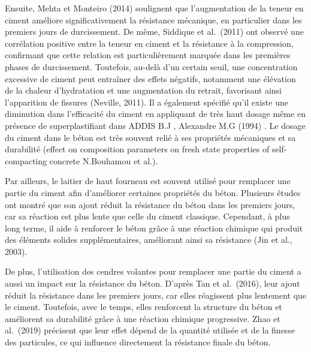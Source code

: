 \documentclass[
  12pt,
]{article}
\begin{document}
Ensuite, Mehta et Monteiro (2014) soulignent que l'augmentation de la
teneur en ciment améliore significativement la résistance mécanique, en
particulier dans les premiers jours de durcissement. De même, Siddique
et al.~(2011) ont observé une corrélation positive entre la teneur en
ciment et la résistance à la compression, confirmant que cette relation
est particulièrement marquée dans les premières phases de durcissement.
Toutefois, au-delà d'un certain seuil, une concentration excessive de
ciment peut entraîner des effets négatifs, notamment une élévation de la
chaleur d'hydratation et une augmentation du retrait, favorisant ainsi
l'apparition de fissures (Neville, 2011). Il a également spécifié qu'il
existe une diminution dans l'efficacité du ciment en appliquant de très
haut dosage même en présence de superplastifiant dans ADDIS B.J ,
Alexandre M.G (1994) . Le dosage du ciment dans le béton est très
souvent relié à ses propriétés mécaniques et sa durabilité (effect on
composition parameters on fresh state properties of self-compacting
concrete N.Bouhamou et al.).

Par ailleurs, le laitier de haut fourneau est souvent utilisé pour
remplacer une partie du ciment afin d'améliorer certaines propriétés du
béton. Plusieurs études ont montré que son ajout réduit la résistance du
béton dans les premiers jours, car sa réaction est plus lente que celle
du ciment classique. Cependant, à plus long terme, il aide à renforcer
le béton grâce à une réaction chimique qui produit des éléments solides
supplémentaires, améliorant ainsi sa résistance (Jin et al., 2003).

De plus, l'utilisation des cendres volantes pour remplacer une partie du
ciment a aussi un impact sur la résistance du béton. D'après Tan et
al.~(2016), leur ajout réduit la résistance dans les premiers jours, car
elles réagissent plus lentement que le ciment. Toutefois, avec le temps,
elles renforcent la structure du béton et améliorent sa durabilité grâce
à une réaction chimique progressive. Zhao et al.~(2019) précisent que
leur effet dépend de la quantité utilisée et de la finesse des
particules, ce qui influence directement la résistance finale du béton.
\end{document}
